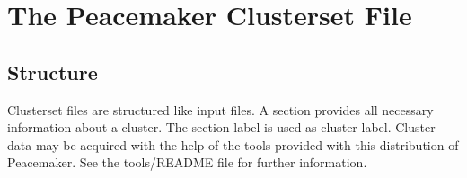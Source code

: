 \documentclass{scrartcl}
\begin{document}
\newpage
\section{The Peacemaker Clusterset File}
\label{sec:clusterset}

\subsection{Structure}
Clusterset files are structured like input files.
A section provides all necessary information about a cluster.
The section label is used as cluster label.
Cluster data may be acquired with the help of the tools provided with this distribution of Peacemaker.
See the tools/README file for further information.
\end{document}
